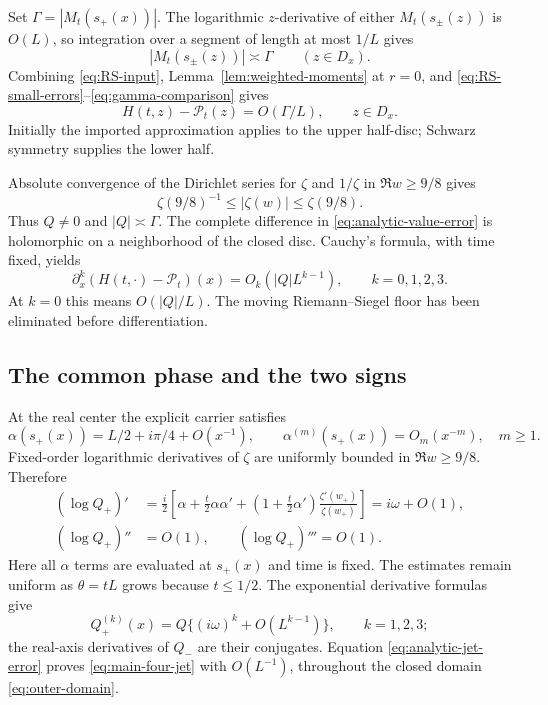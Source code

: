 \documentclass[11pt]{article}
\numberwithin{equation}{section}
\theoremstyle{definition}
\theoremstyle{remark}
\begin{document}
Set $\Gamma=|M_t(s_+(x))|$. The logarithmic $z$-derivative of either
$M_t(s_\pm(z))$ is $O(L)$, so integration over a segment of length
at most $1/L$ gives
\begin{equation}
 |M_t(s_\pm(z))|\asymp\Gamma\qquad(z\in D_x).
 \label{eq:gamma-comparison}
\end{equation}
Combining \eqref{eq:RS-input}, Lemma~\ref{lem:weighted-moments} at
$r=0$, and \eqref{eq:RS-small-errors}--\eqref{eq:gamma-comparison}
gives
\begin{equation}
 H(t,z)-\mathcal P_t(z)=O(\Gamma/L),\qquad z\in D_x.
 \label{eq:analytic-value-error}
\end{equation}
Initially the imported approximation applies to the upper half-disc;
Schwarz symmetry supplies the lower half.

Absolute convergence of the Dirichlet series for $\zeta$ and
$1/\zeta$ in $\Re w\ge9/8$ gives
\begin{equation}
 \zeta(9/8)^{-1}\le|\zeta(w)|\le\zeta(9/8).
 \label{eq:zeta-nonzero}
\end{equation}
Thus $Q\ne0$ and $|Q|\asymp\Gamma$. The complete difference in
\eqref{eq:analytic-value-error} is holomorphic on a neighborhood of
the closed disc. Cauchy's formula, with time fixed, yields
\begin{equation}
 \partial_x^k(H(t,\cdot)-\mathcal P_t)(x)
       =O_k(|Q|L^{k-1}),\qquad k=0,1,2,3.
 \label{eq:analytic-jet-error}
\end{equation}
At $k=0$ this means $O(|Q|/L)$. The moving Riemann--Siegel floor has
been eliminated before differentiation.

\subsection{The common phase and the two signs}
At the real center the explicit carrier satisfies
\begin{equation}
 \alpha(s_+(x))=L/2+i\pi/4+O(x^{-1}),\qquad
 \alpha^{(m)}(s_+(x))=O_m(x^{-m}),\quad m\ge1.
 \label{eq:alpha-asymptotics}
\end{equation}
Fixed-order logarithmic derivatives of $\zeta$ are uniformly bounded
in $\Re w\ge9/8$. Therefore
\begin{align}
 (\log Q_+)'&=\frac i2\left[\alpha+\frac t2\alpha\alpha'
  +\left(1+\frac t2\alpha'\right)
                        \frac{\zeta'(w_+)}{\zeta(w_+)}\right]
             =i\omega+O(1),\label{eq:phase-derivative}\\
 (\log Q_+)''&=O(1),\qquad
 (\log Q_+)'''=O(1).\label{eq:higher-log-derivatives}
\end{align}
Here all $\alpha$ terms are evaluated at $s_+(x)$ and time is fixed.
The estimates remain uniform as $\theta=tL$ grows because $t\le1/2$.
The exponential derivative formulas give
\[
 Q_+^{(k)}(x)=Q\{(i\omega)^k+O(L^{k-1})\},\qquad k=1,2,3;
\]
the real-axis derivatives of $Q_-$ are their conjugates. Equation
\eqref{eq:analytic-jet-error} proves \eqref{eq:main-four-jet} with
$O(L^{-1})$, throughout the closed domain \eqref{eq:outer-domain}.
\end{document}
